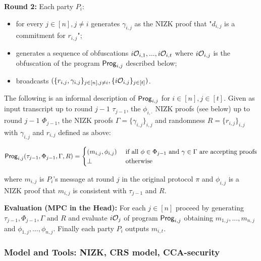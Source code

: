 \noindent
\textbf{Round 2:} Each party $P_i$:
\begin{itemize}
	\item for every $j \in [n], j \not = i$ generates $\gamma_{i,j}$ as the NIZK proof that "$d_{i,j}$ is a commitment for $r_{i,j}$";
	\item generates a sequence of obfuscations $i\mathcal{O}_{i,1},...,i\mathcal{O}_{i,t}$ where $i\mathcal{O}_{i,j}$ is the obfuscation of the program $\mathsf{Prog}_{i,j}$ described below;
	\item broadcasts $( \{ r_{i,j}, \gamma_{i,j} \}_{j \in [n], j \not = i}, \{ i\mathcal{O}_{i,j} \}_{j \in [t]})$.
\end{itemize}

The following is an informal description of $\mathsf{Prog}_{i,j}$ for $i \in [n], j \in [t]$.
Given as input transcript up to round $j-1$ $\tau_{j-1}$, the $\phi_{i,\cdot}$ NIZK proofs (see below) up to round $j-1$ $\Phi_{j-1}$, the NIZK proofs $\Gamma = \{ \gamma_{i,j} \}_{i,j}$ and randomness $R = \{ r_{i,j} \}_{i,j}$ with $\gamma_{i,j}$ and $r_{i,j}$ defined as above:

\[
\Prog_{i,j}(\tau_{j-1}, \Phi_{j-1}, \Gamma, R) =
\begin{cases} 
\hfill (m_{i,j}, \phi_{i,j})    \hfill & \text{ if all $\phi \in \Phi_{j-1}$ and $\gamma \in \Gamma$ are accepting proofs} \\
\bot \hfill & \text{ otherwise } \\
\end{cases}
\]

where $m_{i,j}$ is $P_i$'s message at round $j$ in the original protocol $\pi$ and $\phi_{i,j}$ is a NIZK proof that $m_{i,j}$ is consistent with $\tau_{j-1}$ and $R$.

\noindent
\textbf{Evaluation (MPC in the Head):} For each $j \in [n]$ proceed by generating $\tau_{j-1}, \Phi_{j-1}, \Gamma \mbox{ and } R$ and evaluate $i\mathcal{O}_j$ of program $\mathsf{Prog}_{i,j}$ obtaining $m_{1,j},...,m_{n,j}$
and $\phi_{1,j},...,\phi_{n,j}$. Finally each party $P_i$ outputs $m_{i,t}$.




\subsubsection{Model and Tools: NIZK, CRS model, CCA-security}


